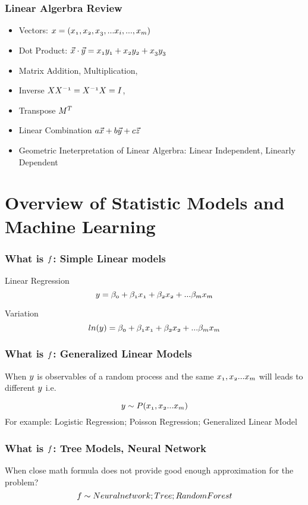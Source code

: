 \documentclass[notheorems, aspectratio=54]{beamer}
\begin{document}
\begin{frame}
\frametitle{Linear Algerbra Review}
\begin{itemize}
\item Vectors: $\mathnormal{x=(x_1, x_2, x_3,...x_i, ..., x_m)}$
\item Dot Product: $\mathnormal{\vec{x}\cdot\vec{y}=x_1 y_1+x_2 y_2+x_3 y_3}$
\item Matrix Addition, Multiplication, 
\item Inverse $\mathnormal{{X}X^{-1}=X^{-1}X=I}$, 
\item Transpose $\mathnormal{M^{T}}$
\item Linear Combination $\mathnormal{a\vec{x}+b\vec{y}+c\vec{z}}$
\item Geometric Ineterpretation of Linear Algerbra: Linear Independent, Linearly Dependent
\end{itemize}
\end{frame}

\section{Overview of Statistic Models and Machine Learning}

\begin{frame}
\frametitle{What is $\mathnormal{f}$: Simple Linear models}

Linear Regression
$$\mathnormal{y=\beta_0+\beta_1 x_1+ \beta_2 x_2 + ... \beta_m x_m}$$

Variation
$$\mathnormal{ln(y)=\beta_0+\beta_1 x_1+ \beta_2 x_2 + ... \beta_m x_m}$$

\end{frame}


\begin{frame}
\frametitle{What is $\mathnormal{f}$: Generalized Linear Models}
When $\mathnormal{y}$ is observables of a random process and the same $\mathnormal{x_1, x_2 ... x_m}$ will leads to different $\mathnormal{y}$ i.e.

$$\mathnormal{y\sim P(x_1, x_2 ... x_m)}$$
\vspace{0.2cm}
For example: 
Logistic Regression;
Poisson Regression;
Generalized Linear Model
\end{frame}

\begin{frame}
\frametitle{What is $\mathnormal{f}$: Tree Models, Neural Network}
When close math formula does not provide good enough approximation for the problem? \\

$$\mathnormal{f}\sim
Neural network; 
Tree; 
Random Forest
$$ 
\end{frame}
\end{document}
